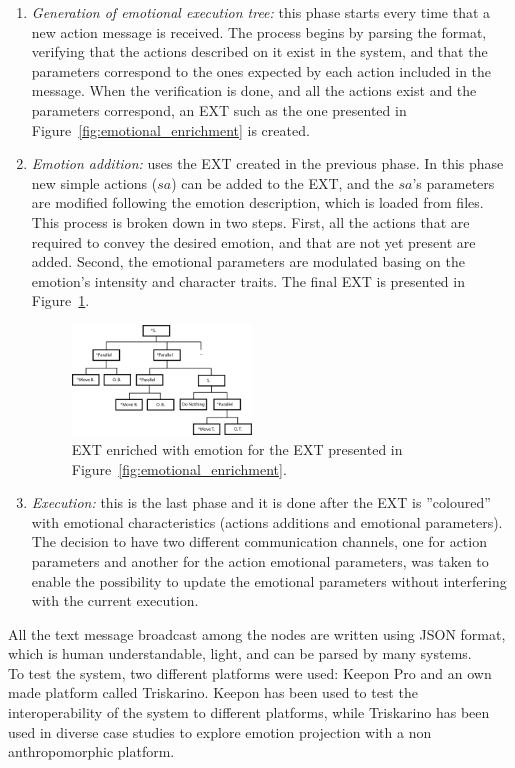 \begin{enumerate}
	\item \textit{Generation of emotional execution tree:} this phase starts every time that a new action message is received. The process begins by parsing the format, verifying that the actions described on it exist in the system, and that the parameters correspond to the ones expected by each action included in the message. 
When the verification is done, and all the actions exist and the parameters correspond, an EXT such as the one presented in Figure~\ref{fig:emotional_enrichment} is created.
	\item \textit{Emotion addition:} uses the EXT created in the previous phase. In this phase new simple actions ($sa$)
can be added to the EXT, and the $sa$'s parameters are modified following the emotion description, which is loaded from files. This process is broken down in two steps. First, all the actions that are required to convey the desired emotion, and that are not yet present are added. Second, the emotional parameters are modulated basing on the emotion's intensity and character traits. The final EXT is presented in Figure~\ref{fig:reference}.
	\begin{figure}
		\centering
	\includegraphics[width=0.45\textwidth]{./Images/exampleTreeE.png}
	\caption{EXT enriched with emotion for the EXT presented in Figure~\ref{fig:emotional_enrichment}.} 
	\label{fig:reference}
	\end{figure}
	\item \textit{Execution:} this is the last phase and it is done after the EXT is ''coloured'' with emotional characteristics (actions additions and emotional parameters). The decision to have two different communication channels, one for action parameters and another for the action emotional parameters, was taken to enable the possibility to update the emotional parameters without interfering with the current execution. 
\end{enumerate}

All the text message broadcast among the nodes are written using JSON format, which is human understandable, light, and can be parsed by many systems.\\ 
To test the system, two different platforms were used: Keepon Pro %
and an own made platform called Triskarino.
Keepon has been used to test the interoperability of the system to different platforms, while Triskarino has been used in diverse case studies to explore emotion projection with a non anthropomorphic platform.
